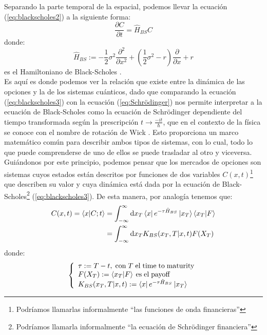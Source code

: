 \documentclass[11pt,a4paper]{article}
\begin{document}
Separando la parte temporal de la espacial, podemos llevar la ecuaci\'on (\ref{eq:blackscholes2}) a la siguiente forma:
\begin{equation}
\frac{\partial C}{\partial t} = \hat{H}_{BS}C
\label{eq:blackscholes3}
\end{equation}
donde:
\begin{equation}
\hat{H}_{BS} := - \frac{1}{2} \sigma^2 \frac{\partial^2 }{\partial x^2} + \left( \frac{1}{2} \sigma^2 - r \right)\frac{\partial }{\partial x} + r
\label{eq:blackscholes4}
\end{equation}
es el Hamiltoniano de Black-Scholes \cite{ziemann2021quantum}. \\
Es aqu\'i es donde podemos ver la relaci\'on que existe entre la din\'amica de las opciones y la de los sistemas cu\'anticos, dado que comparando la ecuaci\'on (\ref{eq:blackscholes3}) con la ecuaci\'on (\ref{eq:Schrödinger}) nos permite interpretar a la ecuaci\'on de Black-Scholes como la ecuaci\'on de Schr\"odinger dependiente del tiempo transformada seg\'un la prescripci\'on $t \rightarrow \frac{-it}{\hbar}$, que en el contexto de la f\'isica se conoce con el nombre de rotaci\'on de Wick \cite{capuozzo2021path}. Esto proporciona un marco matem\'atico com\'un para describir ambos tipos de sistemas, con lo cual, todo lo que puede comprenderse de uno de ellos se puede trasladar al otro y viceversa. Gui\'andonos por este principio, podemos pensar que los mercados de opciones son sistemas cuyos estados est\'an descritos por funciones de dos variables $C(x,t)$\footnote{Podr\'iamos llamarlas informalmente ``las funciones de onda financieras''} que describen su valor y cuya din\'amica est\'a dada por la ecuaci\'on de Black-Scholes\footnote{Podr\'iamos llamarla informalmente ``la ecuaci\'on de Schr\"odinger financiera''}  (\ref{eq:blackscholes3}). De esta manera, por analog\'ia tenemos que:
\begin{equation}
\begin{split}
C(x,t) = \braket{x|C;t} & = \int_{-\infty}^{\infty}\mathrm{d}x_T \bra{x}e^{-\tau \hat{H}_{BS}}\ket{x_T}\braket{x_T|F} \\
& = \int_{-\infty}^{\infty}\mathrm{d}x_T K_{BS}(x_T,T|x,t) F(X_T)
\end{split}
\label{eq:blackscholespropagator1}
\end{equation}
donde:
\begin{equation}
\left\{
\begin{array}{l}
\tau := T - t, \; \mathrm{con} \; T \; \mathrm{el} \; \mathrm{time} \; \mathrm{to} \; \mathrm{maturity} \\
F(X_T) := \braket{x_T|F} \: \mathrm{es} \; \mathrm{el} \; \mathrm{payoff} \\
K_{BS}(x_T,T|x,t) := \bra{x}e^{-\tau \hat{H}_{BS}}\ket{x_T}
\end{array}
\right.
\label{eq:blackscholespropagatorrelation}
\end{equation}
\end{document}
